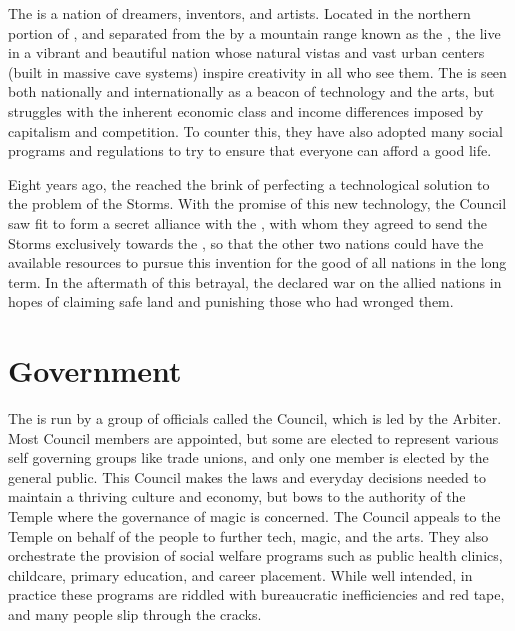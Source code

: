 \documentclass[blue]{GL2020}
\begin{document}
\name{\bTech{}}

The \pTech{} is a nation of dreamers, inventors, and artists.  Located in the northern portion of \pEarth{}, and separated from the \pFarm{} by a mountain range known as the \pSpine{}, the \pTechies{} live in a vibrant and beautiful nation whose natural vistas and vast urban centers (built in massive cave systems) inspire creativity in all who see them.  The \pTech{} is seen both nationally and internationally as a beacon of technology and the arts, but struggles with the inherent economic class and income differences imposed by capitalism and competition.  To counter this, they have also adopted many social programs and regulations to try to ensure that everyone can afford a good life.  

Eight years ago, the \pTechies{} reached the brink of perfecting a technological solution to the problem of the Storms.  With the promise of this new technology, the Council saw fit to form a secret alliance with the \pFarm{}, with whom they agreed to send the Storms exclusively towards the \pShippies{}, so that the other two nations could have the available resources to pursue this invention for the good of all nations in the long term.  In the aftermath of this betrayal, the \pShip{} declared war on the allied nations in hopes of claiming safe land and punishing those who had wronged them.

\section*{Government}
The \pTech{} is run by a group of officials called the Council, which is led by the Arbiter.  Most Council members are appointed, but some are elected to represent various self governing groups like trade unions, and only one member is elected by the general public.  This Council makes the laws and everyday decisions needed to maintain a thriving culture and economy, but bows to the authority of the Temple where the governance of magic is concerned.  The Council appeals to the Temple on behalf of the people to further tech, magic, and the arts.  They also orchestrate the provision of social welfare programs such as public health clinics, childcare, primary education, and career placement. While well intended, in practice these programs are riddled with bureaucratic inefficiencies and red tape, and many people slip through the cracks.
\end{document}
